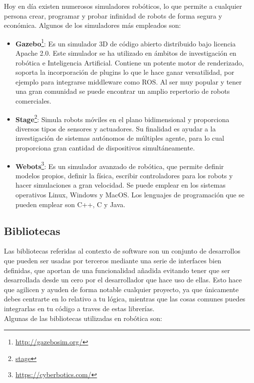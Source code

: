 Hoy en día existen numerosos simuladores robóticos, lo que permite a cualquier persona crear, programar y probar infinidad de robots de forma segura y económica. Algunos de los simuladores más empleados son:

\begin{itemize}
\item \textbf{Gazebo}\footnote{\url{http://gazebosim.org/}}: Es un simulador 3D de código abierto distribuido bajo licencia Apache 2.0. Este simulador se ha utilizado en ámbitos de investigación en robótica e Inteligencia Artificial. Contiene un potente motor de renderizado, soporta la incorporación de plugins lo que le hace ganar versatilidad, por ejemplo para integrarse middleware como ROS. Al ser muy popular y tener una gran comunidad se puede encontrar un amplio repertorio de robots comerciales.
\item \textbf{Stage}\footnote{\href{http://playerstage.sourceforge.net/index.php?src=stage}{stage}}: Simula robots móviles en el plano bidimensional y proporciona diversos tipos de sensores y actuadores. Su finalidad es ayudar a la investigación de sistemas autónomos de múltiples agente, para lo cual proporciona gran cantidad de dispositivos simultáneamente.
\item \textbf{Webots}\footnote{\url{https://cyberbotics.com/}}: Es un simulador avanzado de robótica, que permite definir modelos propios, definir la física, escribir controladores para los robots y hacer simulaciones a gran velocidad. Se puede emplear en los sistemas operativos Linux, Windows y MacOS. Los lenguajes de programación que se pueden emplear son  C++, C y Java.
\end{itemize}

\subsection{Bibliotecas}
Las bibliotecas referidas al contexto de software son un conjunto de desarrollos que pueden ser usadas por terceros mediante una serie de interfaces bien definidas, que aportan de una funcionalidad añadida evitando tener que ser desarrollada desde un cero por el desarrollador que hace uso de ellas. Esto hace que agilicen y ayuden de forma notable cualquier proyecto, ya que únicamente debes centrarte en lo relativo a tu lógica, mientras que las cosas comunes puedes integrarlas en tu código a traves de estas librerías.\\

Algunas de las bibliotecas utilizadas en robótica son:

